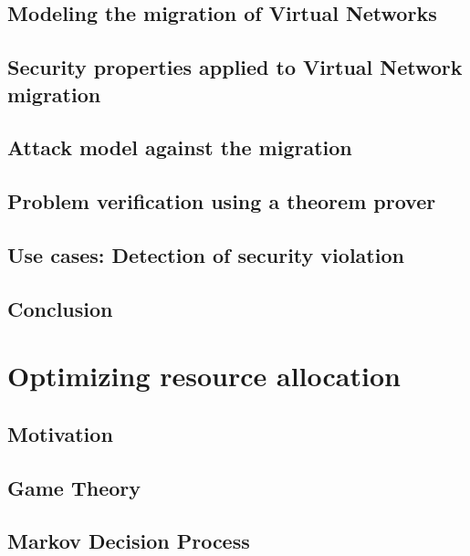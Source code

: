 \documentclass[a4paper, 11pt]{article}
\begin{document}
\subsection{Modeling the migration of Virtual Networks}


\subsection{Security properties applied to Virtual Network migration}


\subsection{Attack model against the migration}


\subsection{Problem verification using a theorem prover}


\subsection{Use cases: Detection of security violation}


\newpage
\subsection{Conclusion}


\newpage
\section{Optimizing resource allocation}
\subsection{Motivation}




\newpage
\subsection{Game Theory}


\newpage
\subsection{Markov Decision Process}


\newpage


\newpage
{}


\newpage
\begin{appendices}

\newpage

\end{appendices}
\end{document}
